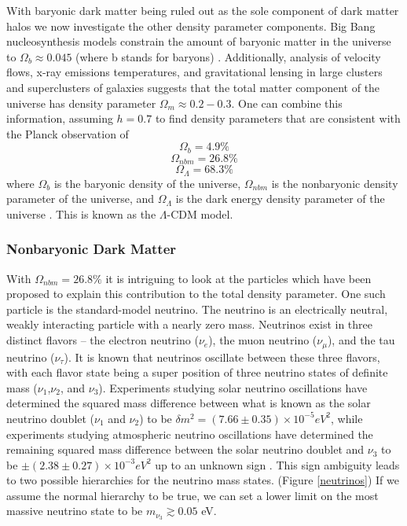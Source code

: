 \documentclass[a4paper,12pt]{article}
\begin{document}
With baryonic dark matter being ruled out as the sole component of dark matter halos we now investigate the other density parameter components. Big Bang nucleosynthesis models constrain the amount of baryonic matter in the universe to $\Omega_b \approx 0.045$ (where b stands for baryons) \cite{Tytler}.  Additionally, analysis of velocity flows, x-ray emissions temperatures, and gravitational lensing in large clusters and superclusters of galaxies suggests that the total matter component of the universe has density parameter $\Omega_m \approx 0.2-0.3$.  One can combine this information, assuming $h=0.7$ to find density parameters that are consistent with the Planck observation of
\[\Omega_b = 4.9\% \]
\[\Omega_{nbm} = 26.8\% \]
\[\Omega_\Lambda = 68.3\%\]
where $\Omega_b$ is the baryonic density of the universe, $\Omega_{nbm}$ is the nonbaryonic density parameter of the universe, and $\Omega_\Lambda$ is the dark energy density parameter of the universe \cite{Spergel,Planck}. This is known as the $\Lambda$-CDM model. 

\subsubsection{Nonbaryonic Dark Matter}

With $\Omega_{nbm} = 26.8\% $ it is intriguing to look at the particles which have been proposed to explain this contribution to the total density parameter. One such particle is the standard-model neutrino.  The neutrino is an electrically neutral, weakly interacting particle with a nearly zero mass.  Neutrinos exist in three distinct flavors -- the electron neutrino ($\nu_e$), the muon neutrino ($\nu_\mu$), and the tau neutrino ($\nu_\tau$).  It is known that neutrinos oscillate between these three flavors, with each flavor state being a super position of three neutrino states of definite mass ($\nu_1$,$\nu_2$, and $\nu_3$).  Experiments studying solar neutrino oscillations have determined the squared mass difference between what is known as the solar neutrino doublet ($\nu_1$ and $\nu_2$) to be $\delta m^2 = (7.66 \pm 0.35) \times 10^{-5} eV^2$, while experiments studying atmospheric neutrino oscillations have determined the remaining squared mass difference between the solar neutrino doublet and $\nu_3$ to be $\pm (2.38 \pm 0.27) \times 10^{-3} eV^2$ up to an unknown sign \cite{Robertson}.  This sign ambiguity leads to two possible hierarchies for the neutrino mass states. (Figure \ref{neutrinos})  If we assume the normal hierarchy to be true, we can set a lower limit on the most massive neutrino state to be $ m_{\nu_3} \gtrsim 0.05$ eV.
\end{document}
